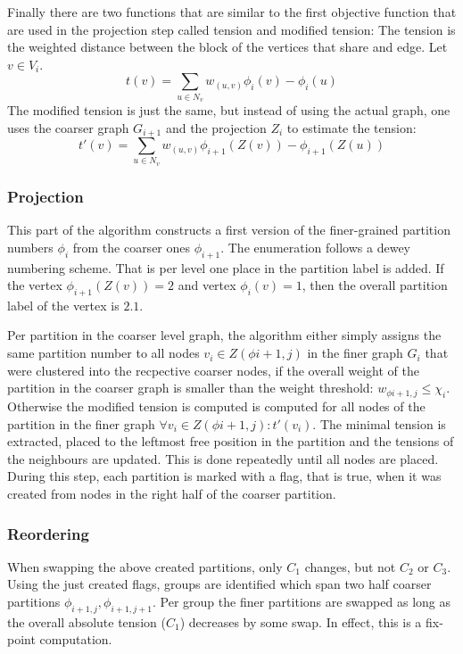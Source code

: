     Finally there are two functions that are similar to the first objective function that are used in the projection step called tension and modified tension:
    The tension is the weighted distance between the block of the vertices that share and edge. Let $v \in V_i$.
    \[ t(v) = \sum_{u \in N_v} w_{(u,v)} \phi_i(v) - \phi_i(u)\]
     The modified tension is just the same, but instead of using the actual graph, one uses the coarser graph $G_{i+1}$ and the projection $Z_{i}$ to estimate the tension:
     \[ t'(v) = \sum_{u \in N_v} w_{(u, v)} \phi_{i+1}(Z(v)) - \phi_{i+1}(Z(u)) \]
    
        \subsubsection*{Projection}
        This part of the algorithm constructs a first version of the finer-grained partition numbers $\phi_i$ from the coarser ones $\phi_{i + 1}$.
        The enumeration follows a dewey numbering scheme.
        That is per level one place in the partition label is added. 
        If the vertex $\phi_{i+1}(Z(v)) = 2$ and vertex $\phi_i(v) = 1$, then the overall partition label of the vertex is $2\text{.}1$. 
        
        Per partition in the coarser level graph, the algorithm either simply assigns the same partition number to all nodes $v_i \in Z(\phi{i+1,j})$ in the finer graph $G_i$ that were clustered into the recpective coarser nodes, if the overall weight of the partition in the coarser graph is smaller than the weight threshold: $w_{\phi{i+1, j}} \leq \chi_i$.
        Otherwise the modified tension is computed is computed for all nodes of the partition in the finer graph $\forall v_i \in Z(\phi{i+1,j}): t'(v_i)$.
        The minimal tension is extracted, placed to the leftmost free position in the partition and the tensions of the neighbours are updated. 
        This is done repeatedly until all nodes are placed.
        During this step, each partition is marked with a flag, that is true, when it was created from nodes in the right half of the coarser partition.
                
        \subsubsection*{Reordering}
        When swapping the above created partitions, only $C_1$ changes, but not $C_2$ or $C_3$. Using the just created flags, groups are identified which span two half coarser partitions $\phi_{i+1,j}, \phi_{i+1,j+1}$. Per group the finer partitions are swapped as long as the overall absolute tension ($C_1$) decreases by some swap.
        In effect, this is a fix-point computation.
        
